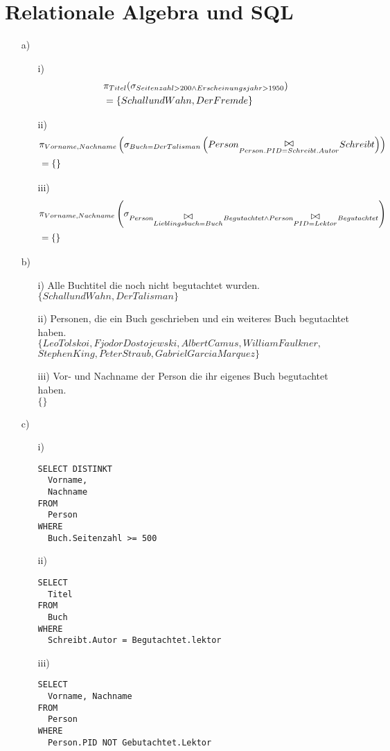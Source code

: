 \documentclass[ngerman]{gdb-aufgabenblatt}
\begin{document}
\section{Relationale Algebra und SQL}
\begin{enumerate}
\item[a)]
\begin{enumerate}
\item[i)]
\begin{align*}
&\pi_{Titel}(\sigma_{Seitenzahl>200 \land Erscheinungsjahr>1950})\\
&=\{Schall und Wahn, Der Fremde\}
\end{align*}
\item[ii)]
\begin{align*}
&\projektion{Vorname, Nachname} \left( \selektion{Buch=Der Talisman}\left( Person\verbund{Person.PID=Schreibt.Autor}Schreibt \right) \right)\\
&=\{  \}
\end{align*}
\item[iii)]
\begin{align*}
&\projektion{Vorname, Nachname} \left( \selektion{Person \verbund{Lieblingsbuch=Buch}Begutachtet \land Person \verbund{PID=Lektor}Begutachtet}\right)\\
&=\{  \}
\end{align*}
\end{enumerate}
\item[b)]
\begin{enumerate}
\item[i)]
Alle Buchtitel die noch nicht begutachtet wurden.\\
$\{Schall und Wahn, Der Talisman\}$
\item[ii)]
Personen, die ein Buch geschrieben und ein weiteres Buch begutachtet haben.\\
$\{Leo Tolskoi, Fjodor Dostojewski, Albert Camus, William Faulkner,$\\$ Stephen King, Peter Straub, Gabriel Garcia Marquez \}$
\item[iii)]
Vor- und Nachname der Person die ihr eigenes Buch begutachtet haben.\\
$\{ \}$
\end{enumerate}
\item[c)]
\begin{enumerate}
\item[i)]
\begin{verbatim}
SELECT DISTINKT
  Vorname,
  Nachname
FROM 
  Person
WHERE
  Buch.Seitenzahl >= 500
\end{verbatim}
\item[ii)]
\begin{verbatim}
SELECT 
  Titel
FROM 
  Buch
WHERE
  Schreibt.Autor = Begutachtet.lektor
\end{verbatim}
\item[iii)]
\begin{verbatim}
SELECT 
  Vorname, Nachname
FROM 
  Person
WHERE
  Person.PID NOT Gebutachtet.Lektor
\end{verbatim}
\end{enumerate}
\end{enumerate}
\end{document}
